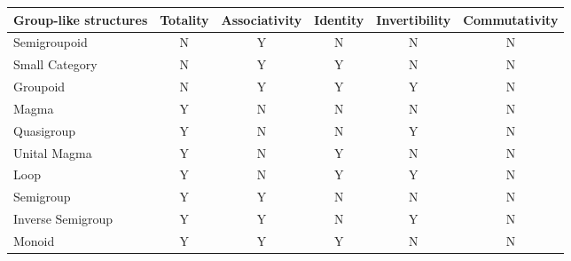 \begin{table}[H]
\begin{tabularx}{\textwidth}{|X|c|c|c|c|c|}
\hline
\rowcolor[HTML]{CFE2F3} 
\textbf{Group-like structures} & \textbf{Totality} & \textbf{Associativity} & \textbf{Identity} & \textbf{Invertibility} & \textbf{Commutativity} \\ \hline
Semigroupoid                  & \cellcolor[HTML]{F4CCCC}N  & \cellcolor[HTML]{D9EAD3}Y & \cellcolor[HTML]{F4CCCC}N  & \cellcolor[HTML]{F4CCCC}N  & \cellcolor[HTML]{F4CCCC}N  \\ \hline
Small Category                & \cellcolor[HTML]{F4CCCC}N  & \cellcolor[HTML]{D9EAD3}Y & \cellcolor[HTML]{D9EAD3}Y & \cellcolor[HTML]{F4CCCC}N  & \cellcolor[HTML]{F4CCCC}N  \\ \hline
Groupoid                      & \cellcolor[HTML]{F4CCCC}N  & \cellcolor[HTML]{D9EAD3}Y & \cellcolor[HTML]{D9EAD3}Y & \cellcolor[HTML]{D9EAD3}Y & \cellcolor[HTML]{F4CCCC}N  \\ \hline
Magma                         & \cellcolor[HTML]{D9EAD3}Y  & \cellcolor[HTML]{F4CCCC}N  & \cellcolor[HTML]{F4CCCC}N  & \cellcolor[HTML]{F4CCCC}N  & \cellcolor[HTML]{F4CCCC}N  \\ \hline
Quasigroup                    & \cellcolor[HTML]{D9EAD3}Y  & \cellcolor[HTML]{F4CCCC}N  & \cellcolor[HTML]{F4CCCC}N  & \cellcolor[HTML]{D9EAD3}Y  & \cellcolor[HTML]{F4CCCC}N  \\ \hline
Unital Magma                  & \cellcolor[HTML]{D9EAD3}Y  & \cellcolor[HTML]{F4CCCC}N  & \cellcolor[HTML]{D9EAD3}Y  & \cellcolor[HTML]{F4CCCC}N  & \cellcolor[HTML]{F4CCCC}N  \\ \hline
Loop                          & \cellcolor[HTML]{D9EAD3}Y  & \cellcolor[HTML]{F4CCCC}N  & \cellcolor[HTML]{D9EAD3}Y  & \cellcolor[HTML]{D9EAD3}Y  & \cellcolor[HTML]{F4CCCC}N  \\ \hline
Semigroup                     & \cellcolor[HTML]{D9EAD3}Y  & \cellcolor[HTML]{D9EAD3}Y  & \cellcolor[HTML]{F4CCCC}N  & \cellcolor[HTML]{F4CCCC}N  & \cellcolor[HTML]{F4CCCC}N  \\ \hline
Inverse Semigroup             & \cellcolor[HTML]{D9EAD3}Y  & \cellcolor[HTML]{D9EAD3}Y  & \cellcolor[HTML]{F4CCCC}N  & \cellcolor[HTML]{D9EAD3}Y  & \cellcolor[HTML]{F4CCCC}N  \\ \hline
Monoid                        & \cellcolor[HTML]{D9EAD3}Y  & \cellcolor[HTML]{D9EAD3}Y  & \cellcolor[HTML]{D9EAD3}Y  & \cellcolor[HTML]{F4CCCC}N  & \cellcolor[HTML]{F4CCCC}N  \\ \hline

\end{tabularx}
\end{table}
